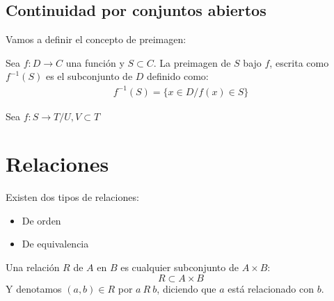 \documentclass{../Topologia.tex}
\begin{document}
\subsection{Continuidad por conjuntos abiertos}
Vamos a definir el concepto de preimagen:
\begin{defin}
	Sea $f:D \to C$ una función y $S\subset C$. La preimagen de $S$ bajo $f$,
	escrita como $f^{-1}(S)$ es el subconjunto de $D$ definido como:
	\begin{equation}
		\begin{split}
			f^{-1}(S) = \{ x \in D / f(x) \in S \}
		\end{split}
	\end{equation}
\end{defin}

Sea $f:S \to T / U,V \subset T$
\section{Relaciones}
Existen dos tipos de relaciones:
\begin{itemize}
    \item De orden
    \item De equivalencia
\end{itemize}

Una relación $R$ de $A$ en $B$ es cualquier subconjunto de $A \times B$:
$$
R \subset A \times B
$$
Y denotamos $(a,b) \in R$ por $a~R~b$, diciendo que $a$ está relacionado con $b$.
\end{document}
